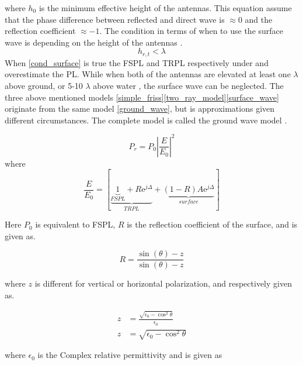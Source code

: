 where $h_0$ is the minimum effective height of the antennas.  This equation assume that the phase difference between reflected and direct wave is $\approx 0$ and the reflection coefficient $\approx -1$. The condition in terms of when to use the surface wave is depending on the height of the antennas \cite{Chong}.
\begin{equation}
h_{r,t} < \lambda
\label{cond_surface}
\end{equation}
When \eqref{cond_surface} is true the FSPL and TRPL respectively under and overestimate the PL.
While when both of the antennas are elevated at least one $\lambda$ above ground, or 5-10 $\lambda$ above water \cite{Chong}, the surface wave can be neglected. 
The three above mentioned models \eqref{simple_friss}\eqref{two_ray_model}\eqref{surface_wave} originate from the same model \eqref{ground_wave}, but is approximations given different circumstances. The complete model is called the ground wave model \cite{Chong,Bullington}. %


\begin{equation}
P_r=P_0 \left|\frac{E}{E_0}\right|^2 
\label{ground_wave}
\end{equation}
where
\begin{equation}
\frac{E}{E_{0}}=[\underbrace{\underbrace{1}_{FSPL}+R\text{e}^{j\Delta}}_{TRPL}+\underbrace{(1-R)A\text{e}^{j\Delta}}_{surface}]
\label{ground_wave_EE0}
\end{equation}

Here $P_{0}$ is equivalent to FSPL, $R$ is the reflection coefficient of the surface, and is given as.

\begin{equation}
R = \frac{\sin(\theta)-z}{\sin(\theta)-z}
\end{equation}

where $z$ is different for vertical or horizontal polarization, and respectively given as.

\begin{align}
z &= \frac{\sqrt{\epsilon_{0}-\cos^{2}\theta}}{\epsilon_{0}} \\
z &= \sqrt{\epsilon_{0}-\cos^{2}\theta}
\end{align}

where $\epsilon_{0}$ is the Complex relative permittivity and is given as 

